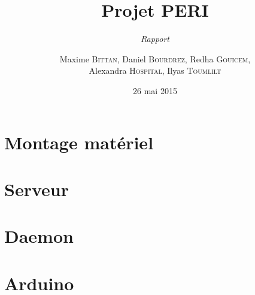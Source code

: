 \documentclass{scrreprt}
\begin{document}
\title{Projet PERI}
\subtitle{\textit{Rapport}}
\date{26 mai 2015}
\author{Maxime \textsc{Bittan}, Daniel \textsc{Bourdrez}, Redha \textsc{Gouicem},\\ Alexandra \textsc{Hospital}, Ilyas \textsc{Toumlilt}}


\maketitle

\pagebreak
\tableofcontents




\chapter{Montage matériel}
\label{ch:montage}


\chapter{Serveur}


\chapter{Daemon}


\chapter{Arduino}

\end{document}
